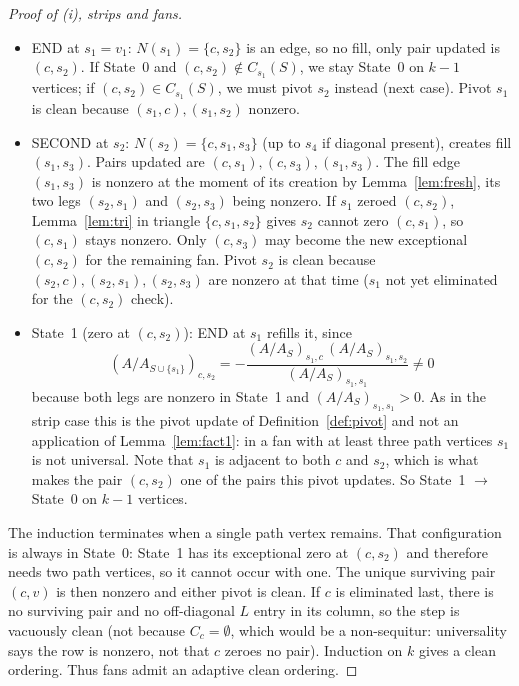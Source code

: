 \documentclass[11pt]{article}
\theoremstyle{plain}
\theoremstyle{definition}
\begin{document}
\begin{aiblock}
\begin{proof}[Proof of (i), strips and fans]
\begin{itemize}
\item END at $s_1=v_1$: $N(s_1)=\{c,s_2\}$ is an edge, so no fill, only pair updated is $(c,s_2)$. If State~0 and $(c,s_2)\notin C_{s_1}(S)$, we stay State~0 on $k-1$ vertices; if $(c,s_2)\in C_{s_1}(S)$, we must pivot $s_2$ instead (next case). Pivot $s_1$ is clean because $(s_1,c),(s_1,s_2)$ nonzero.
\item SECOND at $s_2$: $N(s_2)=\{c,s_1,s_3\}$ (up to $s_4$ if diagonal present), creates fill $(s_1,s_3)$. Pairs updated are $(c,s_1),(c,s_3),(s_1,s_3)$. The fill edge $(s_1,s_3)$ is nonzero at the moment
of its creation by Lemma~\ref{lem:fresh}, its two legs $(s_2,s_1)$ and $(s_2,s_3)$ being nonzero. If
$s_1$ zeroed $(c,s_2)$, Lemma~\ref{lem:tri} in triangle $\{c,s_1,s_2\}$ gives $s_2$ cannot zero $(c,s_1)$, so $(c,s_1)$ stays nonzero. Only $(c,s_3)$ may become the new exceptional $(c,s_2)$ for the remaining fan. Pivot $s_2$ is clean because $(s_2,c),(s_2,s_1),(s_2,s_3)$ are nonzero at that time ($s_1$ not yet eliminated for the $(c,s_2)$ check).
\item State~1 (zero at $(c,s_2)$): END at $s_1$ refills it, since
\[
(A/A_{S\cup\{s_1\}})_{c,s_2}
 = -\frac{(A/A_S)_{s_1,c}\,(A/A_S)_{s_1,s_2}}{(A/A_S)_{s_1,s_1}}\neq0
\]
because both legs are nonzero in State~1 and $(A/A_S)_{s_1,s_1}>0$. As in the strip case this is
the pivot update of Definition~\ref{def:pivot} and not an application of Lemma~\ref{lem:fact1}: in a
fan with at least three path vertices $s_1$ is not universal. Note that $s_1$ is adjacent to both $c$
and $s_2$, which is what makes the pair $(c,s_2)$ one of the pairs this pivot updates. So State~1
$\to$ State~0 on $k-1$ vertices.
\end{itemize}
The induction terminates when a single path vertex remains. That configuration is always in
State~0: State~1 has its exceptional zero at $(c,s_2)$ and therefore needs two path vertices, so it
cannot occur with one. The unique surviving pair $(c,v)$ is then nonzero and either pivot is clean.
If $c$ is eliminated last, there is no surviving pair and no off-diagonal $L$ entry in its column, so
the step is vacuously clean (not because $C_c=\emptyset$, which would be a non-sequitur: universality says the row is nonzero, not that $c$ zeroes no pair). Induction on $k$ gives a clean ordering. Thus fans admit an adaptive clean ordering.

\end{proof}


\end{aiblock}
\end{document}

